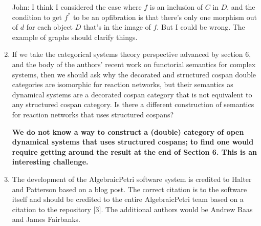 \documentclass[reqno]{amsart}
\def\chris{\color{purple} Christina: }
\def\john{\color{red} John: }
\def\kenny{\color{blue} Kenny: }
\begin{document}
\begin{enumerate}
{\john I think I considered the case where $f$ is an inclusion of $C$ in $D$, and the condition to get $f^\ast$ to be an opfibration is that there's only one morphism out of $d$ for each object $D$ that's in the image of $f$.  But I could be wrong.  The example of graphs should clarify things.}
\fi

\item If we take the categorical systems theory perspective advanced by section 6, and the body of the authors’ recent work on functorial semantics 
for complex 
systems, then we should ask why the decorated and structured cospan double categories are isomorphic for reaction networks, but their semantics as 
dynamical systems are a decorated cospan category that is not equivalent to any structured cospan category. Is there a different construction of 
semantics for reaction networks that uses structured cospans?

{\bf We do not know a way to construct a (double) category of open dynamical systems that uses structured cospans; to find one would require getting around the result at the end of Section 6.  This is an interesting challenge.}

  

\iffalse
{\chris Should we refer to which result we are talking about? Also, I am a bit confused about the question and answer. I thought reaction networks 
can be described in both ways?}

{\kenny I'm kinda' confused by the question, too, due to its wording. Based on what Dr. Baez said in response, I think they might have meant dynamical systems instead of reaction networks in their last sentence. They even say earlier in their comment that the frameworks are isomorphic for reaction networks.}

{\john The referee was asking about the \emph{semantics} for reaction networks --- that is, dynamical systems!  Reaction networks are the ``syntax'' and dynamical systems are our chosen ``semantics'' for these.  But my reply in boldface was confused --- you're right.  So I've fixed it. 
The ``result at the end of Section 6'' is the one where we show the functor from dynamical systems to finite sets doesn't have a left adjoint.  For 
some reason we didn't make this into a theorem.   Give me a check mark if you're happy now.   }

{\chris I see, thanks!}
\fi

\item The development of the AlgebraicPetri software system is credited to Halter and Patterson based on a blog post. The correct citation is to the 
software itself and should be credited to the entire AlgebraicPetri team based on a citation to the repository [3]. The additional authors would be 
Andrew Baas and James Fairbanks.


\end{enumerate}
\end{document}
